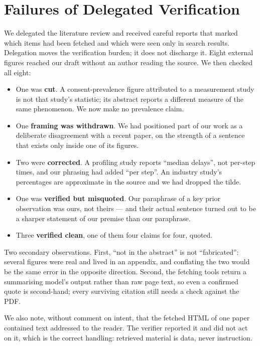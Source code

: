 \documentclass[conference]{IEEEtran}
\begin{document}
\section{Failures of Delegated Verification}

We delegated the literature review and received careful reports that marked
which items had been fetched and which were seen only in search results.
Delegation moves the verification burden; it does not discharge it. Eight
external figures reached our draft without an author reading the source. We
then checked all eight:

\begin{itemize}
\item One was \textbf{cut}. A consent-prevalence figure attributed to a
measurement study is not that study's statistic; its abstract reports a
different measure of the same phenomenon. We now make no prevalence claim.
\item One \textbf{framing was withdrawn}. We had positioned part of our work as
a deliberate disagreement with a recent paper, on the strength of a sentence
that exists only inside one of its figures.
\item Two were \textbf{corrected}. A profiling study reports ``median delays'',
not per-step times, and our phrasing had added ``per step''. An industry
study's percentages are approximate in the source and we had dropped the
tilde.
\item One was \textbf{verified but misquoted}. Our paraphrase of a key prior
observation was ours, not theirs --- and their actual sentence turned out to be
a sharper statement of our premise than our paraphrase.
\item Three \textbf{verified clean}, one of them four claims for four, quoted.
\end{itemize}

Two secondary observations. First, ``not in the abstract'' is not
``fabricated'': several figures were real and lived in an appendix, and
conflating the two would be the same error in the opposite direction. Second,
the fetching tools return a summarising model's output rather than raw page
text, so even a confirmed quote is second-hand; every surviving citation still
needs a check against the PDF.

We also note, without comment on intent, that the fetched HTML of one paper
contained text addressed to the reader. The verifier reported it and did not
act on it, which is the correct handling: retrieved material is data, never
instruction.
\end{document}
